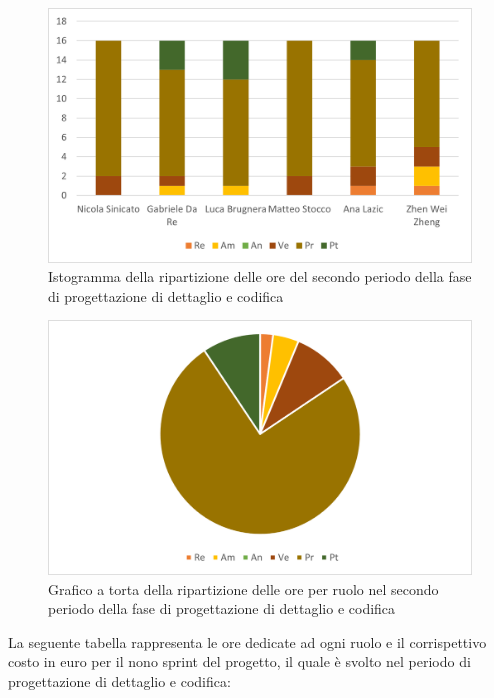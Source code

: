 \begin{figure}[H]
    \centering
    \includegraphics[scale=0.6]{img/grafi preventivo/istogrammi/codifica/periodo2.png}
    \caption{Istogramma della ripartizione delle ore del secondo periodo della fase di progettazione di dettaglio e codifica}
\end{figure}
\begin{figure}[H]
    \centering
    \includegraphics[scale=0.6]{img/grafi preventivo/torta/codifica/periodo2.png}
    \caption{Grafico a torta della ripartizione delle ore per ruolo nel secondo periodo della fase di progettazione di dettaglio e codifica}
\end{figure}
La seguente tabella rappresenta le ore dedicate ad ogni ruolo e il corrispettivo costo in euro per il nono sprint del progetto, il quale è svolto nel periodo di progettazione di dettaglio e codifica:

